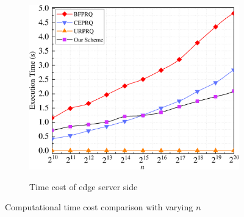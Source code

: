 \documentclass[IEEE JOURNAL OF BIOMEDICAL AND HEALTH INFORMATICS]{IEEEtran}
\begin{document}
{\begin{figure}
	\quad
	\begin{subfigure}[t]{0.3\textwidth}
		\centering
		\includegraphics[width=1\textwidth]{com_3n}\\
		\caption{Time cost of edge server side}
		\label{com_3n}
	\end{subfigure}
	\caption{Computational time cost comparison with varying $n$}\label{computation_n}
\end{figure}

}
\end{document}
